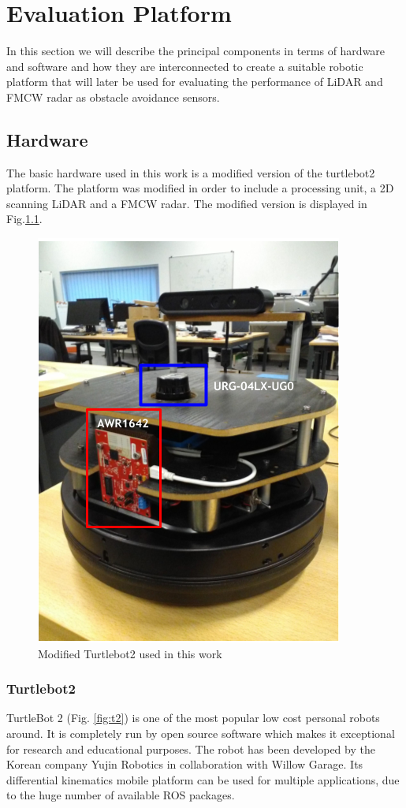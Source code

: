 \chapter{Evaluation Platform}

In this section we will describe the principal components in terms of hardware and software and how they are interconnected to create a suitable robotic platform that will later be used for evaluating the performance of \ac{LiDAR} and \ac{FMCW} \ac{radar} as obstacle avoidance sensors.


\section{Hardware}
The basic hardware used in this work is a  modified version of the  turtlebot2 platform.
The platform was modified in order to include a processing unit, a 2D scanning \ac{LiDAR} and a \ac{FMCW} radar. The modified version is displayed in Fig.\ref{fig::turlebot2M}. 

\begin{figure}[ht!] 
\centerline{\includegraphics [width=0.4 \textwidth]{imgs/chapter4/turtlebot2.PNG}}
\caption{Modified Turtlebot2 used in this work}
\label{fig::turlebot2M}
\end{figure}

\subsection{Turtlebot2}
TurtleBot 2 (Fig. \ref{fig:t2}) is one of the  most popular low cost personal robots around. It is completely run by open source software which makes it exceptional for research and educational purposes. The robot has been developed by the Korean company Yujin Robotics in collaboration with Willow Garage. Its differential kinematics mobile platform can be used for multiple applications, due to the huge number of available ROS packages. 

